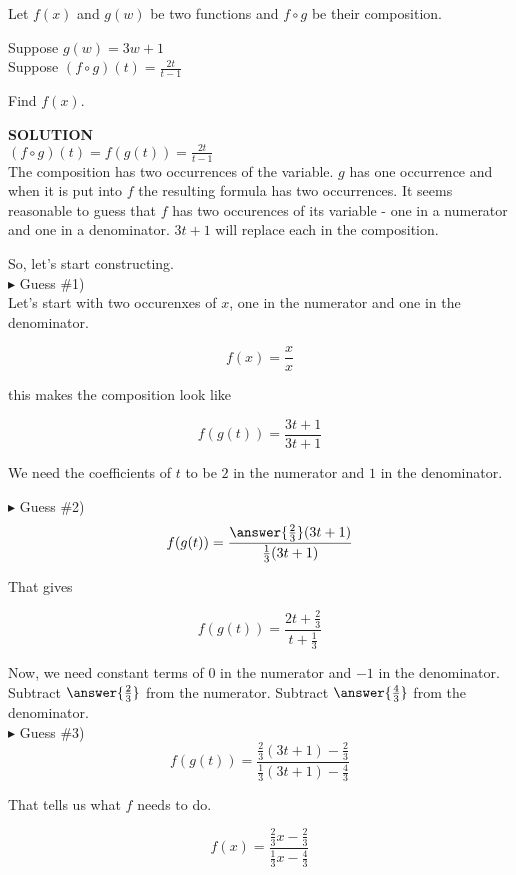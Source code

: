 \documentclass{ximera}
\begin{document}
\begin{example}


Let $f(x)$ and $g(w)$ be two functions and $f \circ g$ be their composition.


Suppose $g(w) = 3w + 1$ \\

Suppose $(f \circ g)(t) = \frac{2t}{t-1}$


Find $f(x)$.



\textbf{\textcolor{purple!50!blue!90!black}{SOLUTION}} \\




$(f \circ g)(t) =  f(g(t)) =  \frac{2t}{t-1}$ \\



The composition has two occurrences of the variable.  $g$ has one occurrence and when it is put into $f$ the resulting formula has two occurrences.  It seems reasonable to guess that $f$ has two occurences of its variable - one in a numerator and one in a denominator.  $3t + 1$ will replace each in the composition.

So, let's start constructing. \\


$\blacktriangleright$  Guess \#1) \\

Let's start with two occurenxes of $x$, one in the numerator and one in the denominator.

\[      f(x) = \frac{x}{x}       \]


this makes the composition look like

\[   f(g(t)) =      \frac{3t + 1}{3t + 1}       \]



We need the coefficients of $t$ to be $2$ in the numerator and $1$ in the denominator.

$\blacktriangleright$  Guess \#2) \\

\[   f(g(t)) =      \frac{\answer{\frac{2}{3}}(3t + 1)}{\frac{1}{3}(3t + 1)}       \]

That gives


\[   f(g(t)) =      \frac{2t + \frac{2}{3}}{t + \frac{1}{3}}       \]



Now, we need constant terms of $0$ in the numerator and $-1$ in the denominator.  Subtract $\answer{\frac{2}{3}}$ from the numerator. Subtract $\answer{\frac{4}{3}}$ from the denominator. \\

$\blacktriangleright$  Guess \#3) \\


\[   f(g(t)) =      \frac{\frac{2}{3}(3t + 1) - \frac{2}{3}}{\frac{1}{3}(3t + 1) - \frac{4}{3}}       \]

That tells us what $f$ needs to do.




\[   f(x) =      \frac{\frac{2}{3}x - \frac{2}{3}}{\frac{1}{3}x - \frac{4}{3}}       \]



\end{example}
\end{document}
